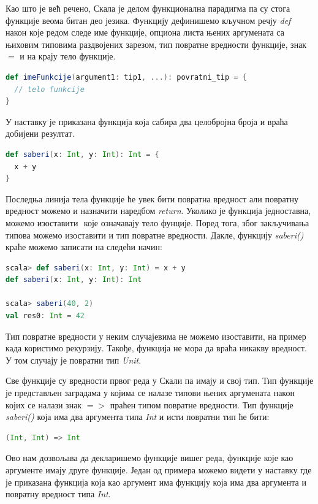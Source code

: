 \documentclass[12pt,oneside]{memoir}
\begin{document}
Као што је већ речено, Скала је делом функционална парадигма па су стога функције веома битан део језика. Функцију дефинишемо кључном речју \textit{def} након које редом следе име функције, опциона листа њених аргумената са њиховим типовима раздвојених зарезом, тип повратне вредности функције, знак $=$ и на крају тело функције.

\begin{lstlisting}[language=Scala]
def imeFunkcije(argument1: tip1, ...): povratni_tip = {
  // telo funkcije
}

\end{lstlisting}

У наставку је приказана функција која сабира два целобројна броја и враћа добијени резултат. 

\begin{lstlisting}[language=Scala]
def saberi(x: Int, y: Int): Int = {
  x + y
}
\end{lstlisting}

Последња линија тела функције ће увек бити повратна вредност али повратну вредност можемо и назначити наредбом \textit{return}. Уколико је функција једноставна, можемо изоставити ${ }$ које означавају тело фунције. Поред тога, због закључивања типова можемо изоставити и тип повратне вредности. Дакле, функцију \textit{saberi()} краће можемо записати на следећи начин:

\begin{lstlisting}[language=Scala]
scala> def saberi(x: Int, y: Int) = x + y
def saberi(x: Int, y: Int): Int

scala> saberi(40, 2)
val res0: Int = 42
\end{lstlisting}

Тип повратне вредности у неким случајевима не можемо изоставити, на пример када користимо рекурзију. Такође, функција не мора да враћа никакву вредност. У том случају је повратни тип \textit{Unit}. \cite{scala_prog}

Све функције су вредности првог реда у Скали па имају и свој тип. Тип функције је представљен заградама у којима се налазе типови њених аргумената након којих се налази знак $=>$ праћен типом повратне вредности. Тип функције \textit{saberi()} која има два аргумента типа \textit{Int} и исти повратни тип ће бити:

\begin{lstlisting}[language=Scala]
(Int, Int) => Int
\end{lstlisting}

Ово нам дозвољава да декларишемо функције вишег реда, функције које као аргументе имају друге функције. Један од примера можемо видети у наставку где је приказана функција која као аргумент има функцију која има два аргумента и повратну вредност типа \textit{Int}.
\end{document}
